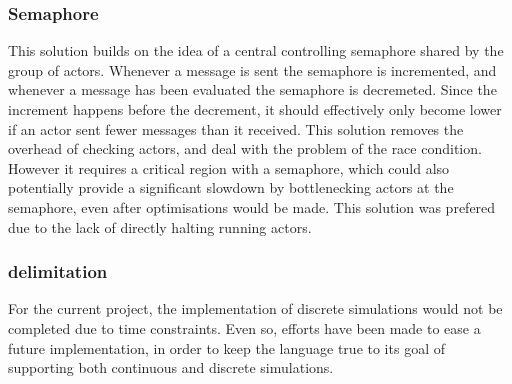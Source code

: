 \subsubsection{Semaphore}

This solution builds on the idea of a central controlling semaphore shared by the group of actors. Whenever a message is sent the semaphore is incremented, and whenever a message has been evaluated the semaphore is decremeted. Since the increment happens before the decrement, it should effectively only become lower if an actor sent fewer messages than it received. This solution removes the overhead of checking actors, and deal with the problem of the race condition. However it requires a critical region with a semaphore, which could also potentially provide a significant slowdown by bottlenecking actors at the semaphore, even after optimisations would be made. This solution was prefered due to the lack of directly halting running actors.

\subsubsection{delimitation}

For the current project, the implementation of discrete simulations would not be completed due to time constraints. Even so, efforts have been made to ease a future implementation, in order to keep the language true to its goal of supporting both continuous and discrete simulations.